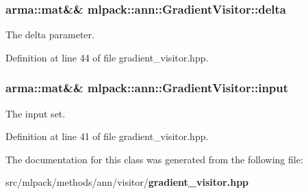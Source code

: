 \subsubsection[{delta}]{\setlength{\rightskip}{0pt plus 5cm}arma\+::mat\&\& mlpack\+::ann\+::\+Gradient\+Visitor\+::delta\hspace{0.3cm}{\ttfamily [private]}}\label{classmlpack_1_1ann_1_1GradientVisitor_a8559ec5204fa93d05d5b6b5f31c7c92e}


The delta parameter. 



Definition at line 44 of file gradient\+\_\+visitor.\+hpp.

\subsubsection[{input}]{\setlength{\rightskip}{0pt plus 5cm}arma\+::mat\&\& mlpack\+::ann\+::\+Gradient\+Visitor\+::input\hspace{0.3cm}{\ttfamily [private]}}\label{classmlpack_1_1ann_1_1GradientVisitor_a434995ae46b25626016c0f50677d68fb}


The input set. 



Definition at line 41 of file gradient\+\_\+visitor.\+hpp.



The documentation for this class was generated from the following file\+:\begin{DoxyCompactItemize}
\item 
src/mlpack/methods/ann/visitor/{\bf gradient\+\_\+visitor.\+hpp}\end{DoxyCompactItemize}
